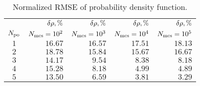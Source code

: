 \begin{table}
  \centering
  \caption{Normalized RMSE of probability density function.}
  \vspace{-10pt}
  \begin{tabular}{crrrr}
    \toprule
    {} & $\delta\rho, \%$ & $\delta\rho, \%$ & $\delta\rho, \%$ & $\delta\rho, \%$ \\
    ${N_\text{po}}$ & $N_\text{mcs} = 10^2$ & $N_\text{mcs} = 10^3$ & $N_\text{mcs} = 10^4$ & $N_\text{mcs} = 10^5$ \\
    \midrule
    $1$ & $16.67$ & $16.57$ & $17.51$ & $18.13$ \\
    $2$ & $18.78$ & $15.84$ & $15.67$ & $16.67$ \\
    $3$ & $14.17$ & $ 9.54$ & $ 8.38$ & $ 8.18$ \\
    $4$ & $15.28$ & $ 8.18$ & $ 4.99$ & $ 4.89$ \\
    $5$ & $13.50$ & $ 6.59$ & $ 3.81$ & $ 3.29$ \\
    \bottomrule
  \end{tabular}
  \vspace{-10pt}
\end{table}
